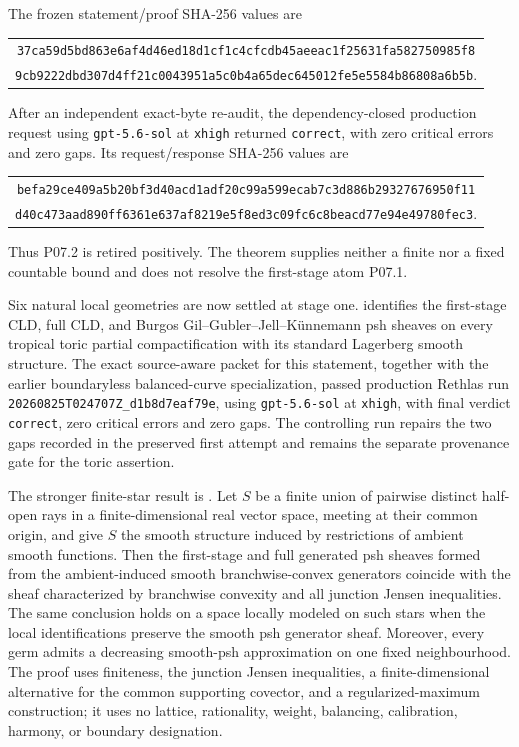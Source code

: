 The frozen statement/proof SHA-256 values are
\begin{center}
\small
\begin{tabular}{@{}c@{}}
\nolinkurl{37ca59d5bd863e6af4d46ed18d1cf1c4cfcdb45aeeac1f25631fa582750985f8}\\
\nolinkurl{9cb9222dbd307d4ff21c0043951a5c0b4a65dec645012fe5e5584b86808a6b5b}.
\end{tabular}
\end{center}
After an independent exact-byte re-audit, the dependency-closed production
request using \texttt{gpt-5.6-sol} at \texttt{xhigh} returned
\texttt{correct}, with zero critical errors and zero gaps.  Its
request/response SHA-256 values are
\begin{center}
\small
\begin{tabular}{@{}c@{}}
\nolinkurl{befa29ce409a5b20bf3d40acd1adf20c99a599ecab7c3d886b29327676950f11}\\
\nolinkurl{d40c473aad890ff6361e637af8219e5f8ed3c09fc6c8beacd77e94e49780fec3}.
\end{tabular}
\end{center}
Thus P07.2 is retired positively.  The theorem supplies neither a finite nor
a fixed countable bound and does not resolve the first-stage atom P07.1.

Six natural local geometries are now settled at stage one.
 identifies the first-stage CLD,
full CLD, and Burgos Gil--Gubler--Jell--K\"unnemann psh sheaves on every
tropical toric partial compactification with its standard Lagerberg smooth
structure.  The exact source-aware packet for this statement, together with
the earlier boundaryless balanced-curve specialization, passed production
Rethlas run
\nolinkurl{20260825T024707Z_d1b8d7eaf79e}, using
\texttt{gpt-5.6-sol} at \texttt{xhigh}, with final verdict
\texttt{correct}, zero critical errors and zero gaps.  The controlling run
repairs the two gaps recorded in the preserved first attempt and remains the
separate provenance gate for the toric assertion.

The stronger finite-star result is
.  Let $S$ be a finite union
of pairwise distinct half-open rays in a finite-dimensional real vector
space, meeting at their common origin, and give $S$ the smooth structure
induced by restrictions of ambient smooth functions.  Then the first-stage
and full generated psh sheaves formed from the ambient-induced smooth
branchwise-convex generators coincide with the sheaf characterized by
branchwise convexity and all junction Jensen inequalities.  The same
conclusion holds on a space locally modeled on such stars when the local
identifications preserve the smooth psh generator sheaf.  Moreover,
every germ admits a decreasing smooth-psh approximation on one fixed
neighbourhood.  The proof uses finiteness, the junction Jensen inequalities,
a finite-dimensional alternative for the common supporting covector, and a
regularized-maximum construction; it uses no lattice, rationality, weight,
balancing, calibration, harmony, or boundary designation.

